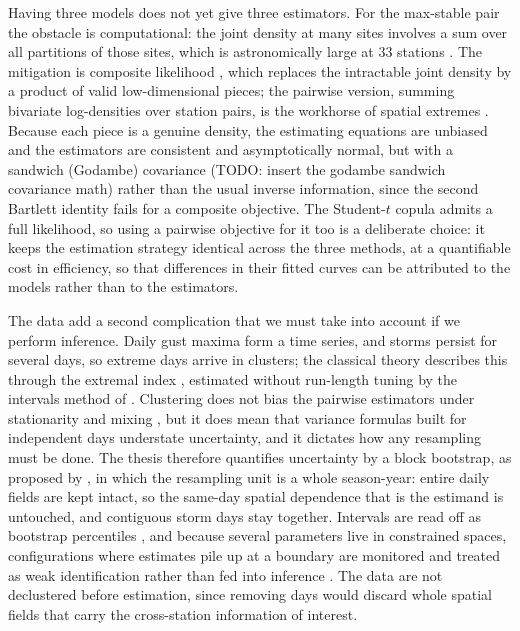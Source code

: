 Having three models does not yet give three estimators. For the max-stable pair the obstacle is computational: the joint density at many sites involves a sum over all partitions of those sites, which is astronomically large at \(33\) stations \citep{padoan2010}. The mitigation is composite likelihood \citep{lindsay1988,varin2011}, which replaces the intractable joint density by a product of valid low-dimensional pieces; the pairwise version, summing bivariate log-densities over station pairs, is the workhorse of spatial extremes \citep{padoan2010,huser2013}. Because each piece is a genuine density, the estimating equations are unbiased and the estimators are consistent and asymptotically normal, but with a sandwich (Godambe) covariance (TODO: insert the godambe sandwich covariance math) rather than the usual inverse information, since the second Bartlett identity fails for a composite objective. The Student-\(t\) copula admits a full likelihood, so using a pairwise objective for it too is a deliberate choice: it keeps the estimation strategy identical across the three methods, at a quantifiable cost in efficiency, so that differences in their fitted curves can be attributed to the models rather than to the estimators.

The data add a second complication that we must take into account if we perform inference. Daily gust maxima form a time series, and storms persist for several days, so extreme days arrive in clusters; the classical theory describes this through the extremal index \citep{leadbetter1983,coles2001}, estimated without run-length tuning by the intervals method of \citet{ferro2003}. Clustering does not bias the pairwise estimators under stationarity and mixing \citep{huserdavison2014}, but it does mean that variance formulas built for independent days understate uncertainty, and it dictates how any resampling must be done. The thesis therefore quantifies uncertainty by a block bootstrap, as proposed by \citep{kuensch1989,lahiri2003}, in which the resampling unit is a whole season-year: entire daily fields are kept intact, so the same-day spatial dependence that is the estimand is untouched, and contiguous storm days stay together. Intervals are read off as bootstrap percentiles \citep{davisonhinkley1997}, and because several parameters live in constrained spaces, configurations where estimates pile up at a boundary are monitored and treated as weak identification rather than fed into inference \citep{andrews2001}. The data are not declustered before estimation, since removing days would discard whole spatial fields that carry the cross-station information of interest.

